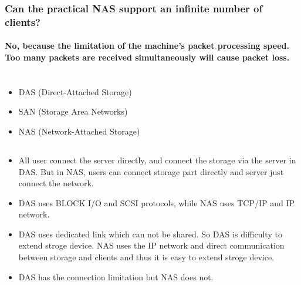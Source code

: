 \documentclass{article}
\begin{document}
            \subsubsection{ Can the practical NAS support an infinite number of clients?}
                \paragraph{
                    No, because the limitation of the machine's packet processing speed. Too many packets are received simultaneously will cause packet loss.
                }
    \section{}
        \subsection{}
            \begin{itemize}
                \item DAS (Direct-Attached Storage)
                \item SAN (Storage Area Networks)
                \item NAS (Network-Attached Storage)
            \end{itemize}
        \subsection{}
            \begin{itemize}
                \item All user connect the server directly, and connect the storage via the server in DAS. But in NAS, users can connect storage part directly and server just connect the network.
                \item DAS uses BLOCK I/O and SCSI protocols, while NAS uses TCP/IP and IP network.
                \item DAS uses dedicated link which can not be shared. So DAS is difficulty to extend stroge device. NAS uses the IP network and direct communication between storage and clients and thus it is easy to extend stroge device.
                \item DAS has the connection limitation but NAS does not.               
            \end{itemize}
    \section{}
        \subsection{}
            
\end{document}
